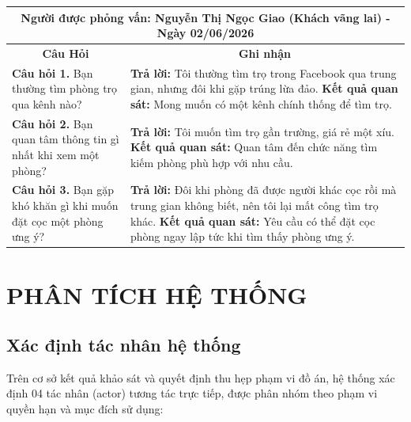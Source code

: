 \documentclass[a4paper,oneside]{report}
\begin{document}
\noindent
\begin{tabularx}{\textwidth}{|p{}|X|}
\hline
\multicolumn{2}{|c|}{\small\textbf{Người được phỏng vấn: Nguyễn Thị Ngọc Giao (Khách vãng lai) - Ngày 02/06/2026}} \\ \hline
\multicolumn{1}{|c|}{\textbf{Câu Hỏi}} & \multicolumn{1}{c|}{\textbf{Ghi nhận}} \\ \hline
\textbf{\color{red}Câu hỏi 1.} Bạn thường tìm phòng trọ qua kênh nào? & \textbf{\color{red}Trả lời:} Tôi thường tìm trọ trong Facebook qua trung gian, nhưng đôi khi gặp trúng lừa đảo. \textbf{\color{red}Kết quả quan sát:} Mong muốn có một kênh chính thống để tìm trọ. \\ \hline
\textbf{\color{red}Câu hỏi 2.} Bạn quan tâm thông tin gì nhất khi xem một phòng? & \textbf{\color{red}Trả lời:} Tôi muốn tìm trọ gần trường, giá rẻ một xíu. \newline
\textbf{\color{red}Kết quả quan sát:} Quan tâm đến chức năng tìm kiếm phòng phù hợp với nhu cầu. \\ \hline
\textbf{\color{red}Câu hỏi 3.} Bạn gặp khó khăn gì khi muốn đặt cọc một phòng ưng ý? & \textbf{\color{red}Trả lời:} Đôi khi phòng đã được người khác cọc rồi mà trung gian không biết, nên tôi lại mất công tìm trọ khác. \newline
\textbf{\color{red}Kết quả quan sát:} Yêu cầu có thể đặt cọc phòng ngay lập tức khi tìm thấy phòng ưng ý. \\ \hline
\end{tabularx}
\chapter{PHÂN TÍCH HỆ THỐNG}

\section{Xác định tác nhân hệ thống}

Trên cơ sở kết quả khảo sát và quyết định thu hẹp phạm vi đồ án, hệ
thống xác định 04 tác nhân (actor) tương tác trực tiếp, được phân nhóm
theo phạm vi quyền hạn và mục đích sử dụng:
\end{document}
